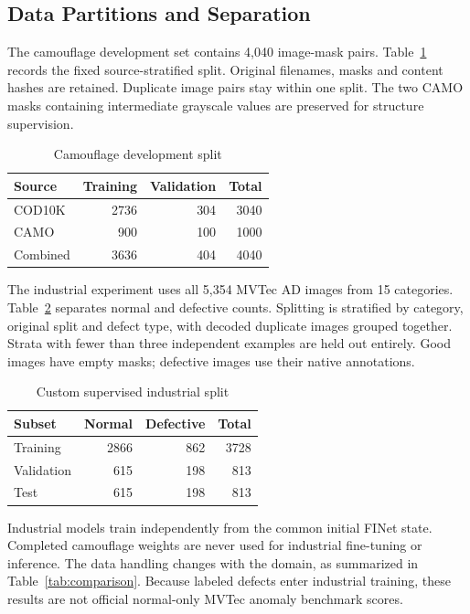 \documentclass[conference,letterpaper]{IEEEtran}
\begin{document}
\subsection{Data Partitions and Separation}
The camouflage development set contains 4,040 image-mask pairs. Table~\ref{tab:camosplit} records the fixed source-stratified split. Original filenames, masks and content hashes are retained. Duplicate image pairs stay within one split. The two CAMO masks containing intermediate grayscale values are preserved for structure supervision.

\begin{table}[!t]
\caption{Camouflage development split}
\label{tab:camosplit}
\centering
\begin{tabular}{lrrr}
\hline
Source & Training & Validation & Total\\
\hline
COD10K & 2736 & 304 & 3040\\
CAMO & 900 & 100 & 1000\\
Combined & 3636 & 404 & 4040\\
\hline
\end{tabular}
\end{table}

The industrial experiment uses all 5,354 MVTec AD images from 15 categories. Table~\ref{tab:industrialsplit} separates normal and defective counts. Splitting is stratified by category, original split and defect type, with decoded duplicate images grouped together. Strata with fewer than three independent examples are held out entirely. Good images have empty masks; defective images use their native annotations.

\begin{table}[!t]
\caption{Custom supervised industrial split}
\label{tab:industrialsplit}
\centering
\begin{tabular}{lrrr}
\hline
Subset & Normal & Defective & Total\\
\hline
Training & 2866 & 862 & 3728\\
Validation & 615 & 198 & 813\\
Test & 615 & 198 & 813\\
\hline
\end{tabular}
\end{table}

Industrial models train independently from the common initial FINet state. Completed camouflage weights are never used for industrial fine-tuning or inference. The data handling changes with the domain, as summarized in Table~\ref{tab:comparison}. Because labeled defects enter industrial training, these results are not official normal-only MVTec anomaly benchmark scores.
\end{document}
